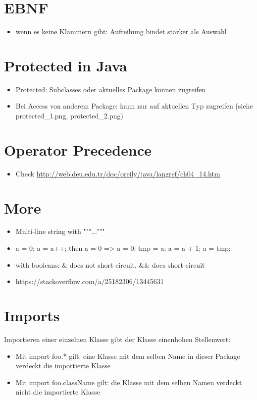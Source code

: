 \documentclass[UTF8]{article}
\begin{document}
\section{EBNF}

\begin{itemize}
    \item wenn es keine Klammern gibt: Aufreihung bindet stärker als Auswahl
\end{itemize}

\section{Protected in Java}

\begin{itemize}
    \item Protected: Subclasses oder aktuelles Package können zugreifen
    \item Bei Access von anderem Package: kann nur auf aktuellen Typ zugreifen (siehe protected_1.png, protected_2.png)
\end{itemize}

\section{Operator Precedence}

\begin{itemize}
    \item Check \url{http://web.deu.edu.tr/doc/oreily/java/langref/ch04_14.htm}
\end{itemize}

\section{More}

\begin{itemize}
    \item Multi-line string with """..."""
    \item a = 0; a = a++; then a = 0 => a = 0; tmp = a; a = a + 1; a = tmp;
    \item with booleans: \& does not short-circuit, \&\& does short-circuit
    \item https://stackoverflow.com/a/25182306/13445631
\end{itemize}

\section{Imports}

Importieren einer einzelnen Klasse gibt der Klasse einenhohen Stellenwert:

\begin{itemize}
    \item Mit import foo.* gilt: eine Klasse mit dem selben Name in dieser Package verdeckt die importierte Klasse
    \item Mit import foo.className gilt: die Klasse mit dem selben Namen verdeckt nicht die importierte Klasse
\end{itemize}
\end{document}
